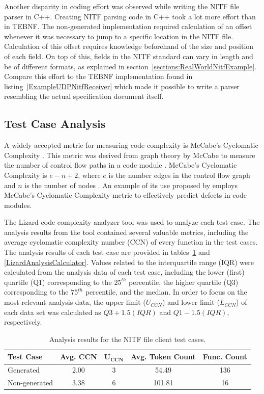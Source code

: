 \indent
Another disparity in coding effort was observed while writing the NITF file parser in C++.  Creating NITF parsing code in C++ took a lot more effort than in TEBNF.  The non-generated implementation required calculation of an offset whenever it was necessary to jump to a specific location in the NITF file.  Calculation of this offset requires knowledge beforehand of the size and position of each field.  On top of this, fields in the NITF standard can vary in length and be of different formats, as explained in section~\ref{sections:RealWorldNitfExample}.  Compare this effort to the TEBNF implementation found in listing~\ref{ExampleUDPNitfReceiver} which made it possible to write a parser resembling the actual specification document itself.

\subsection{Test Case Analysis}
A widely accepted metric for measuring code complexity is McCabe's Cyclomatic Complexity \cite{cardoso_01}.  This metric was derived from graph theory by McCabe to measure the number of control flow paths in a code module \cite{cardoso_01}.  McCabe's Cyclomatic Complexity is $ e - n + 2 $, where $e$ is the number edges in the control flow graph and $n$ is the number of nodes \cite{cardoso_01}.  An example of its use proposed by \cite{zhang_01} employs McCabe's Cyclomatic Complexity metric to effectively predict defects in code modules.

\indent
The Lizard code complexity analyzer \cite{lizard_01} tool was used to analyze each test case.  The analysis results from the tool contained several valuable metrics, including the average cyclomatic complexity number (CCN) \cite{lizard_01} of every function in the test cases.  The analysis results of each test case are provided in tables~\ref{LizardAnalysisFileClient} and \ref{LizardAnalysisCalculator}.  Values related to the interquartile range (IQR) were calculated from the analysis data of each test case, including the lower (first) quartile (Q1) corresponding to the $25^{th}$ percentile, the higher quartile (Q3) corresponding to the $75^{th}$ percentile, and the median.  In order to focus on the most relevant analysis data, the upper limit ($U_{CCN}$) and lower limit ($L_{CCN}$) of each data set was calculated as $Q3 + 1.5(IQR)$ and $Q1 - 1.5(IQR)$, respectively.

\begin{table}[h]
\begin{center}
\caption{Analysis results for the NITF file client test cases.}
\label{LizardAnalysisFileClient}
\begin{tabular}{|l|c|c|c|c|} \hline
\textbf{Test Case} & \textbf{Avg. CCN} & $\mathbf{U_{CCN}}$ & \textbf{Avg. Token Count} & \textbf{Func. Count} \\ \hline \hline
Generated     & 2.00 & 3 & 54.49  & 136 \\ \hline
Non-generated & 3.38 & 6 & 101.81 & 16  \\ \hline
\end{tabular}
\end{center}
\end{table}


